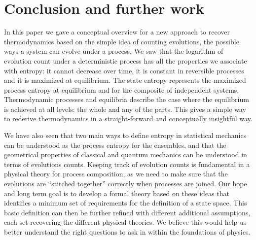 \documentclass[letterpaper,twocolumn]{article}
\begin{document}
\section{Conclusion and further work}

In this paper we gave a conceptual overview for a new approach to recover thermodynamics based on the simple idea of counting evolutions, the possible ways a system can evolve under a process. We saw that the logarithm of evolution count under a deterministic process has all the properties we associate with entropy: it cannot decrease over time, it is constant in reversible processes and it is maximized at equilibrium. The state entropy represents the maximized process entropy at equilibrium and for the composite of independent systems. Thermodynamic processes and equilibria describe the case where the equilibrium is achieved at all levels: the whole and any of the parts. This gives a simple way to rederive thermodynamics in a straight-forward and conceptually insightful way.

We have also seen that two main ways to define entropy in statistical mechanics can be understood as the process entropy for the ensembles, and that the geometrical properties of classical and quantum mechanics can be understood in terms of evolutions counts. Keeping track of evolution counts is fundamental in a physical theory for process composition, as we need to make sure that the evolutions are ``stitched together'' correctly when processes are joined. Our hope and long term goal is to develop a formal theory based on these ideas that identifies a minimum set of requirements for the definition of a state space. This basic definition can then be further refined with different additional assumptions, each set recovering the different physical theories. We believe this would help us better understand the right questions to ask in within the foundations of physics.


\end{document}

